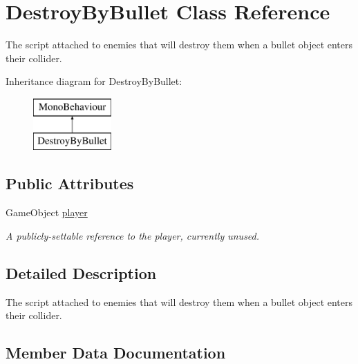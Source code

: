 \hypertarget{class_destroy_by_bullet}{}\section{Destroy\+By\+Bullet Class Reference}
\label{class_destroy_by_bullet}


The script attached to enemies that will destroy them when a bullet object enters their collider.  


Inheritance diagram for Destroy\+By\+Bullet\+:\begin{figure}[H]
\begin{center}
\leavevmode
\includegraphics[height=2.000000cm]{class_destroy_by_bullet}
\end{center}
\end{figure}
\subsection*{Public Attributes}
\begin{DoxyCompactItemize}
\item 
Game\+Object \mbox{\hyperlink{class_destroy_by_bullet_ac3225ab3c49d644840b85519aed90623}{player}}
\begin{DoxyCompactList}\small\item\em A publicly-\/settable reference to the player, currently unused. \end{DoxyCompactList}\end{DoxyCompactItemize}


\subsection{Detailed Description}
The script attached to enemies that will destroy them when a bullet object enters their collider. 

\subsection{Member Data Documentation}
\mbox{\label{class_destroy_by_bullet_ac3225ab3c49d644840b85519aed90623}} 
